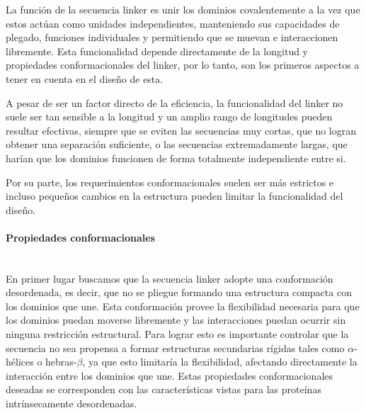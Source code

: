 

La función de la secuencia linker es unir los dominios covalentemente a la vez que estos actúan como unidades independientes, manteniendo sus capacidades de plegado, funciones individuales y 
permitiendo que se muevan e interaccionen libremente. 
Esta funcionalidad depende directamente de la longitud y propiedades conformacionales del linker, por lo tanto, son los primeros aspectos a tener en cuenta en el diseño de esta.

A pesar de ser un factor directo de la eficiencia\cite{robinson1998optimizing}, la funcionalidad del linker no suele ser tan sensible a la longitud y un amplio rango de longitudes pueden resultar efectivas, siempre 
que se eviten las secuencias muy cortas, que no logran obtener una separación suficiente, o las secuencias extremadamente largas, que harían que los dominios funcionen de forma totalmente independiente entre si.

Por su parte, los requerimientos conformacionales suelen ser más estrictos e incluso pequeños cambios en la estructura pueden limitar la funcionalidad del diseño.

\paragraph{Propiedades conformacionales} \hspace{0pt} \\ \indent 
En primer lugar buscamos que la secuencia linker adopte una conformación desordenada, es decir, que no se pliegue formando una estructura compacta con los dominios que une.
Esta conformación provee la flexibilidad necesaria para que los dominios puedan moverse libremente y las interacciones puedan ocurrir sin ninguna restricción estructural.
Para lograr esto es importante controlar que la secuencia no sea propensa a formar estructuras secundarias rígidas tales como $\alpha$-hélices o hebras-$\beta$, ya que esto
limitaría la flexibilidad, afectando directamente la interacción entre los dominios que une.
Estas propiedades conformacionales deseadas se corresponden con las características vistas para las proteínas intrínsecamente desordenadas. 

